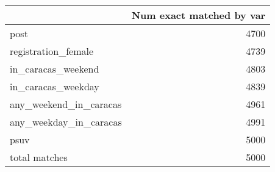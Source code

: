 \begin{tabular}{lr}
\toprule
{} &  Num exact matched by var \\
\midrule
post                   &                      4700 \\
registration\_female    &                      4739 \\
in\_caracas\_weekend     &                      4803 \\
in\_caracas\_weekday     &                      4839 \\
any\_weekend\_in\_caracas &                      4961 \\
any\_weekday\_in\_caracas &                      4991 \\
psuv                   &                      5000 \\
total matches          &                      5000 \\
\bottomrule
\end{tabular}
